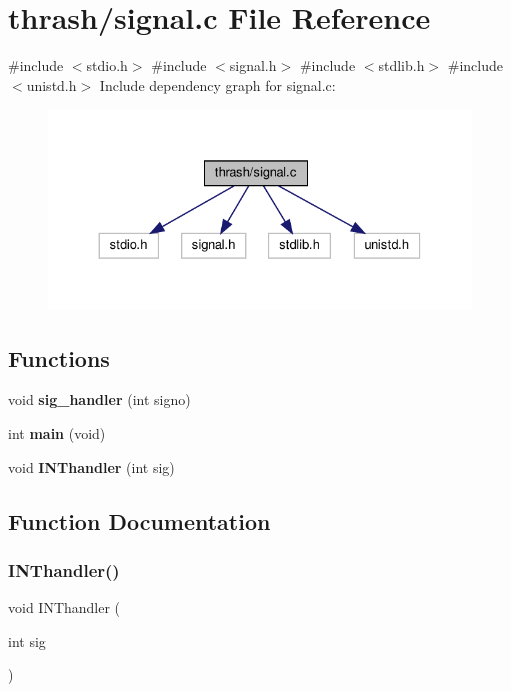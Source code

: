 \section{thrash/signal.c File Reference}
\label{signal_8c}
{\ttfamily \#include $<$stdio.\+h$>$}\newline
{\ttfamily \#include $<$signal.\+h$>$}\newline
{\ttfamily \#include $<$stdlib.\+h$>$}\newline
{\ttfamily \#include $<$unistd.\+h$>$}\newline
Include dependency graph for signal.\+c\+:\nopagebreak
\begin{figure}[H]
\begin{center}
\leavevmode
\includegraphics[width=330pt]{signal_8c__incl}
\end{center}
\end{figure}
\subsection*{Functions}
\begin{DoxyCompactItemize}
\item 
void \textbf{ sig\+\_\+handler} (int signo)
\item 
int \textbf{ main} (void)
\item 
void \textbf{ I\+N\+Thandler} (int sig)
\end{DoxyCompactItemize}


\subsection{Function Documentation}
\mbox{\label{signal_8c_a6a3869251603ae4e569abadbd7dab11c}} 
\subsubsection{I\+N\+Thandler()}
{\footnotesize\ttfamily void I\+N\+Thandler (\begin{DoxyParamCaption}\item[{int}]{sig }\end{DoxyParamCaption})}

